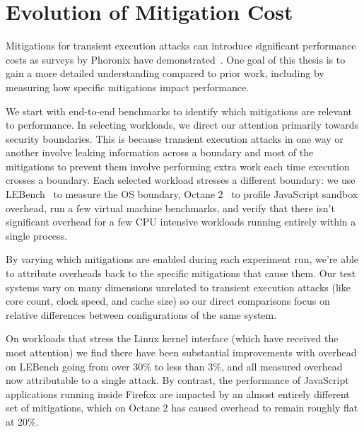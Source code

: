 \section{Evolution of Mitigation Cost}
Mitigations for transient execution attacks can introduce significant performance costs as surveys by Phoronix have demonstrated~\cite{phoronix:perf-zombieload, phoronix:two-years, phoronix:three-years}.
One goal of this thesis is to gain a more detailed understanding compared to prior work, including by measuring how specific mitigations impact performance.

We start with end-to-end benchmarks to identify which mitigations are relevant to performance.
In selecting workloads, we direct our attention primarily towards security boundaries.
This is because transient execution attacks in one way or another involve leaking information across a boundary and most of the mitigations to prevent them involve performing extra work each time execution crosses a boundary. 
Each selected workload stresses a different boundary: we use LEBench~\cite{ren:lebench} to measure the OS boundary, Octane 2~\cite{google:octane2} to profile JavaScript sandbox overhead, run a few virtual machine benchmarks, and verify that there isn't significant overhead for a few CPU intensive workloads running entirely within a single process.

By varying which mitigations are enabled during each experiment run, we're able to attribute overheads back to the specific mitigations that cause them.
Our test systems vary on many dimensions unrelated to transient execution attacks (like core count, clock speed, and cache size) so our direct comparisons focus on relative differences between configurations of the same system.

On workloads that stress the Linux kernel interface (which have received the most attention) we find there have been substantial improvements with overhead on LEBench going from over 30\% to less than 3\%, and all measured overhead now attributable to a single attack.
By contrast, the performance of JavaScript applications running inside Firefox are impacted by an almost entirely different set of mitigations, which on Octane 2 has caused overhead to remain roughly flat at 20\%.

